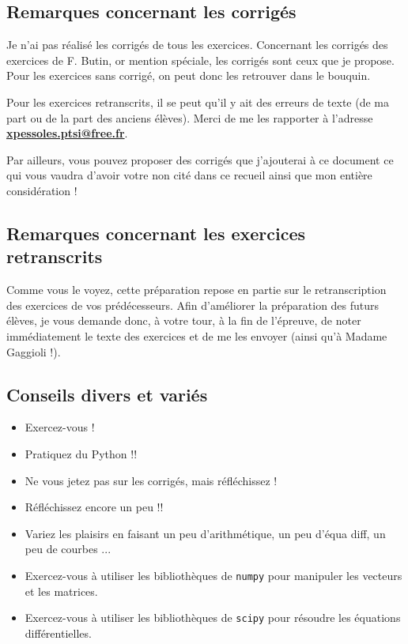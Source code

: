 \documentclass[10pt,fleqn]{article} %
\begin{document}
{\subsection*{Remarques concernant les corrigés}
Je n'ai pas réalisé les corrigés de tous les exercices. Concernant les corrigés des exercices de F. Butin, or mention spéciale, les corrigés sont ceux que je propose. Pour les exercices sans corrigé, on peut donc les retrouver dans le bouquin. 

Pour les exercices retranscrits, il se peut qu'il y ait des erreurs de texte (de ma part ou de la part des anciens élèves). Merci de me les rapporter à l'adresse \textbf{\url{xpessoles.ptsi@free.fr}}. 

Par ailleurs, vous pouvez proposer des corrigés que j'ajouterai à ce document ce qui vous vaudra d'avoir votre non cité dans ce recueil ainsi que mon entière considération !

\subsection*{Remarques concernant les exercices retranscrits}

Comme vous le voyez, cette préparation repose en partie sur le retranscription des exercices de vos prédécesseurs. Afin d'améliorer la préparation des futurs élèves, je vous demande donc, à votre tour, à la fin de l'épreuve, de noter immédiatement le texte des exercices et de me les envoyer (ainsi qu'à Madame Gaggioli !). 

\subsection*{Conseils divers et variés}
\begin{itemize}
\item Exercez-vous !
\item Pratiquez du Python !!
\item Ne vous jetez pas sur les corrigés, mais réfléchissez !
\item Réfléchissez encore un peu !!
\item Variez les plaisirs en faisant un peu d'arithmétique, un peu d'équa diff, un peu de courbes ...
\item Exercez-vous à utiliser les bibliothèques de \texttt{numpy} pour manipuler les vecteurs et les matrices.
\item Exercez-vous à utiliser les bibliothèques de \texttt{scipy} pour résoudre les équations différentielles.
\end{itemize}

}
\end{document}

